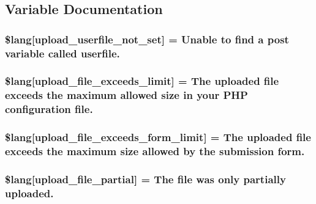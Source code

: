 \subsection{Variable Documentation}
\hypertarget{upload__lang_8php_a6d12ff4074b1e4c6f22a4a5107fae5ee}{}
\subsubsection[{\$lang}]{\setlength{\rightskip}{0pt plus 5cm}\$lang\mbox{[}\textquotesingle{}upload\+\_\+userfile\+\_\+not\+\_\+set\textquotesingle{}\mbox{]} = \textquotesingle{}Unable to find {\bf a} post variable called userfile.\textquotesingle{}}\label{upload__lang_8php_a6d12ff4074b1e4c6f22a4a5107fae5ee}
\hypertarget{upload__lang_8php_a9028f049ebbe292a27e0e2b2e5f7d660}{}
\subsubsection[{\$lang}]{\setlength{\rightskip}{0pt plus 5cm}\$lang\mbox{[}\textquotesingle{}upload\+\_\+file\+\_\+exceeds\+\_\+limit\textquotesingle{}\mbox{]} = \textquotesingle{}The uploaded file exceeds the maximum allowed size in your P\+H\+P configuration file.\textquotesingle{}}\label{upload__lang_8php_a9028f049ebbe292a27e0e2b2e5f7d660}
\hypertarget{upload__lang_8php_af6f65d563af150d50dfc6957079fd529}{}
\subsubsection[{\$lang}]{\setlength{\rightskip}{0pt plus 5cm}\$lang\mbox{[}\textquotesingle{}upload\+\_\+file\+\_\+exceeds\+\_\+form\+\_\+limit\textquotesingle{}\mbox{]} = \textquotesingle{}The uploaded file exceeds the maximum size allowed by the submission form.\textquotesingle{}}\label{upload__lang_8php_af6f65d563af150d50dfc6957079fd529}
\hypertarget{upload__lang_8php_a79751b02ce35007a90bd9052f83deed9}{}
\subsubsection[{\$lang}]{\setlength{\rightskip}{0pt plus 5cm}\$lang\mbox{[}\textquotesingle{}upload\+\_\+file\+\_\+partial\textquotesingle{}\mbox{]} = \textquotesingle{}The file was only partially uploaded.\textquotesingle{}}\label{upload__lang_8php_a79751b02ce35007a90bd9052f83deed9}
\hypertarget{upload__lang_8php_ac7144f4992346816875bac28488ef715}{}
